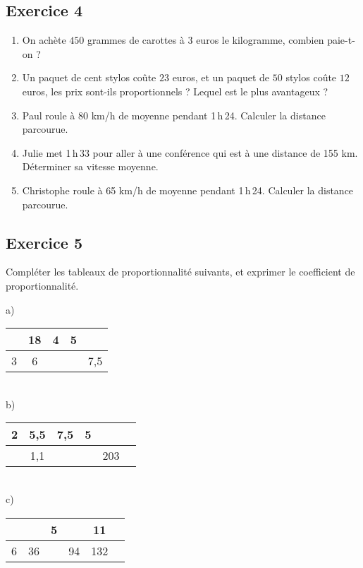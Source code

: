 \documentclass[12 pt]{extarticle}
\theoremstyle{plain}
\begin{document}
\subsection*{Exercice 4}
\begin{enumerate}
\item On achète $450$ grammes de carottes à $3$ euros le kilogramme, combien paie-t-on ? 

\item Un paquet de cent stylos coûte $23$ euros, et un paquet de $50$ 
stylos coûte $12$ euros, les prix sont-ils proportionnels ? Lequel est le plus avantageux ?
	\item Paul roule à 80 km/h de moyenne pendant 1\,h\,24. Calculer la distance parcourue.
	\item Julie met 1\,h\,33 pour aller à une conférence qui est à une distance de 155 km. Déterminer sa vitesse moyenne.
	\item Christophe roule à 65 km/h de moyenne pendant 1\,h\,24. Calculer la distance parcourue.
\end{enumerate}  


 \subsection*{Exercice 5}

Compléter les tableaux de proportionnalité suivants, et exprimer le coefficient de proportionnalité. 

a) \begin{tabular}{ | c |c | c| c|c| }\hline
 & 18  & 4 & 5 & \\
 \hline
 3 & 6 &  &  & 7,5 \\ \hline
\end{tabular} 

 \ \\ 
 
b) \begin{tabular}{|c | c | c | c | c | c}
\hline
2 & 5,5  & 7,5 &  5 &  \\
\hline
 & 1,1 & & &203 \\ \hline

\end{tabular}

 \ \\ 
 
 
c) \begin{tabular}{|c | c | c | c | c | c}
\hline
&  & 5 &   & 11      \\
\hline
6& 36 &  & 94  & 132  \\ \hline

\end{tabular}
\end{document}

